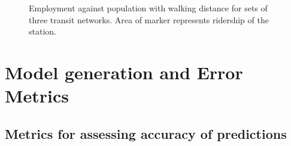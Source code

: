 \documentclass[11pt]{report}
\begin{document}
\begin{figure}
\centering
{}

\vspace{-15pt}
\captionsetup{singlelinecheck=off, justification=centering}
\caption[]{Employment against population with walking distance for sets of three transit networks.\linebreak
Area of marker represents ridership of the station.}\label{fig:networkvars}
\end{figure}


\chapter{Model generation and Error Metrics}

\section{Metrics for assessing accuracy of predictions}\label{sec:metric}
\end{document}
